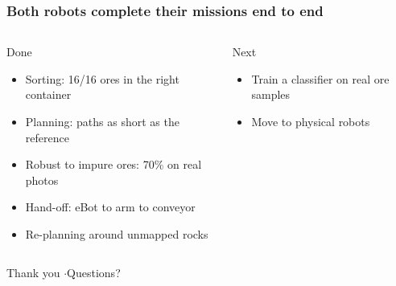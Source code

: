 \documentclass{beamer}
\begin{document}
\begin{frame}
\frametitle{Both robots complete their missions end to end}
\begin{columns}[T]
\begin{block}{Done}
\begin{itemize}
  \item Sorting: 16/16 ores in the right container
  \item Planning: paths as short as the reference
  \item Robust to impure ores: 70\% on real photos
  \item Hand-off: eBot to arm to conveyor
  \item Re-planning around unmapped rocks
\end{itemize}
\end{block}
\begin{exampleblock}{Next}
\begin{itemize}
  \item Train a classifier on real ore samples
  \item Move to physical robots
\end{itemize}
\end{exampleblock}
\end{columns}
\vspace{10pt}
\centering \Large Thank you \quad$\cdot$\quad Questions?
\end{frame}
\end{document}
